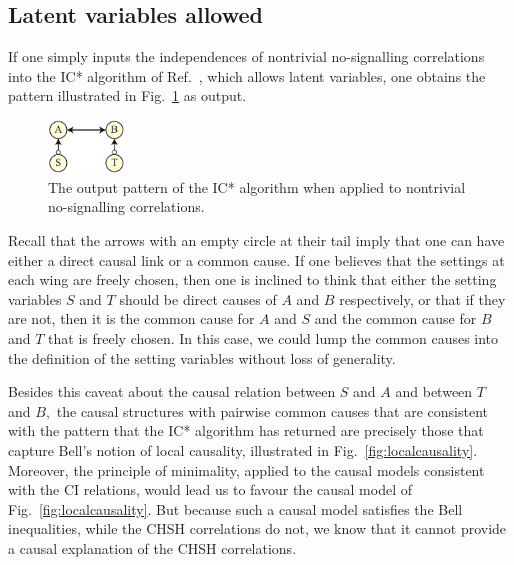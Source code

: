 \documentclass[12pt,onecolumn,nofootinbib]{revtex4-2}
\begin{document}
\subsection{Latent variables allowed}
\label{sec:qcor-hvar}

If one simply inputs the independences of nontrivial no-signalling
correlations into the IC* algorithm of Ref.~\cite{Pearl2009}, which allows latent variables, one obtains the pattern illustrated in Fig.~\ref{fig:bell-ics} as output.

\begin{figure}[h]
	\centering
	\includegraphics[width=0.18\textwidth]{bell-ics}
 \caption{The output pattern of the IC* algorithm when applied to nontrivial no-signalling correlations.}
       \label{fig:bell-ics}
\end{figure}

Recall that the arrows with an empty circle at their tail imply
that one can have either a direct causal link or a common cause.
If one believes that the settings at each wing are freely chosen, then one
is inclined to think that either the setting variables $S$ and $T$ should
be direct causes of $A$ and $B$ respectively, or that if they are not, then it is
the common cause for $A$ and $S$ and the common cause for $B$ and $T$ that is freely chosen.
In this case, we could lump the common causes into the definition of the setting variables without loss of generality.

Besides this caveat about the causal relation between $S$ and $A$ and between
$T$ and $B,$ the causal structures with pairwise common causes that are consistent with the pattern that the IC* algorithm has returned are
precisely those that capture Bell's notion of local causality, illustrated in Fig.~\ref{fig:localcausality}.  Moreover, the principle of minimality, applied to the causal models consistent with the CI relations, would lead us to favour the causal model of Fig.~\ref{fig:localcausality}.    But because such a causal model satisfies the Bell inequalities, while the CHSH correlations do not, we know that it cannot provide a causal explanation of the CHSH correlations. 
\end{document}
